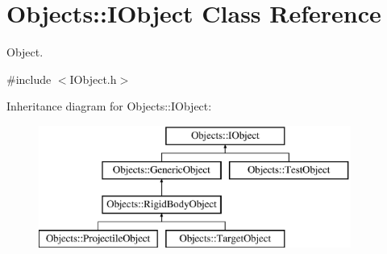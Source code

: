 \hypertarget{class_objects_1_1_i_object}{\section{Objects\-:\-:I\-Object Class Reference}
\label{class_objects_1_1_i_object}
}


Object.  




{\ttfamily \#include $<$I\-Object.\-h$>$}

Inheritance diagram for Objects\-:\-:I\-Object\-:\begin{figure}[H]
\begin{center}
\leavevmode
\includegraphics[height=4.000000cm]{class_objects_1_1_i_object}
\end{center}
\end{figure}
